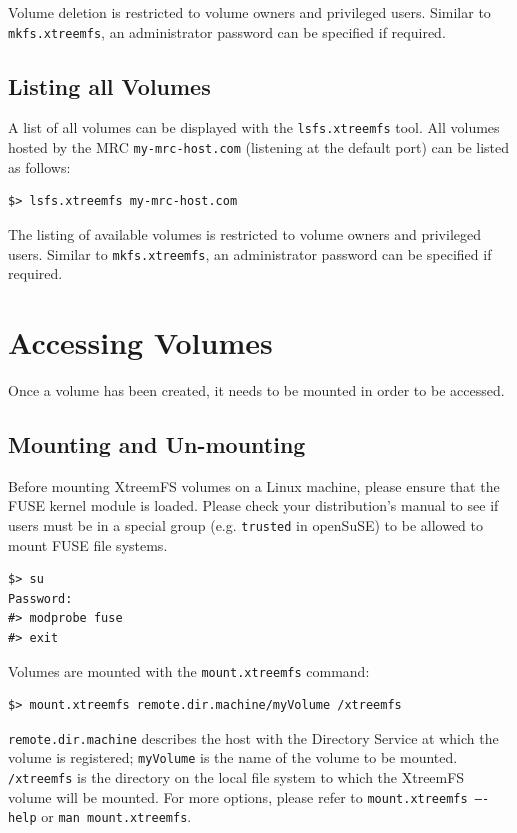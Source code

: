 \documentclass[a4paper,10pt]{book}
\begin{document}
Volume deletion is restricted to volume owners and privileged users. Similar to \texttt{mkfs.xtreemfs}, an administrator password can be specified if required.

\subsection{Listing all Volumes}

A list of all volumes can be displayed with the \texttt{lsfs.xtreemfs} tool. All volumes hosted by the MRC \texttt{my-mrc-host.com} (listening at the default port) can be listed as follows:

\begin{verbatim}
$> lsfs.xtreemfs my-mrc-host.com
\end{verbatim}

The listing of available volumes is restricted to volume owners and privileged users. Similar to \texttt{mkfs.xtreemfs}, an administrator password can be specified if required.

\section{Accessing Volumes}
\label{sec:mount_vol}

Once a volume has been created, it needs to be mounted in order to be accessed.

\subsection{Mounting and Un-mounting}

Before mounting XtreemFS volumes on a Linux machine, please ensure that the FUSE kernel module is loaded. Please check your distribution's manual to see if users must be in a special group (e.g. \texttt{trusted} in openSuSE) to be allowed to mount FUSE file systems.


\begin{verbatim}
$> su
Password:
#> modprobe fuse
#> exit
\end{verbatim}


Volumes are mounted with the \texttt{mount.xtreemfs} command:


\begin{verbatim}
$> mount.xtreemfs remote.dir.machine/myVolume /xtreemfs
\end{verbatim}


\texttt{remote.dir.machine} describes the host with the Directory Service at which the volume is registered; \texttt{myVolume} is the name of the volume to be mounted. \texttt{/xtreemfs} is the directory on the local file system to which the XtreemFS volume will be mounted. For more options, please refer to \texttt{mount.xtreemfs ----help} or \texttt{man mount.xtreemfs}.
\end{document}
